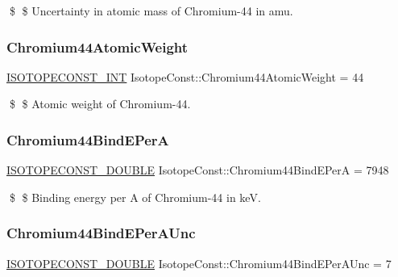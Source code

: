 \$ \$ Uncertainty in atomic mass of Chromium-\/44 in amu. \mbox{\label{group___isotope_const-_chromium-_cr44_gab95901f81604d8b8c011a24b634533bf}} 
\subsubsection{\texorpdfstring{Chromium44\+Atomic\+Weight}{Chromium44AtomicWeight}}
{\footnotesize\ttfamily \mbox{\hyperlink{group___isotope_const-_macros_ga5f18360b3e99483a35c32d789e62621c}{I\+S\+O\+T\+O\+P\+E\+C\+O\+N\+S\+T\+\_\+\+I\+NT}} Isotope\+Const\+::\+Chromium44\+Atomic\+Weight = 44}

\$ \$ Atomic weight of Chromium-\/44. \mbox{\label{group___isotope_const-_chromium-_cr44_ga78a199af93f916420780eabaa50d2ca4}} 
\subsubsection{\texorpdfstring{Chromium44\+Bind\+E\+PerA}{Chromium44BindEPerA}}
{\footnotesize\ttfamily \mbox{\hyperlink{group___isotope_const-_macros_ga8f45a7272ce02c0b4c65c44636ed719a}{I\+S\+O\+T\+O\+P\+E\+C\+O\+N\+S\+T\+\_\+\+D\+O\+U\+B\+LE}} Isotope\+Const\+::\+Chromium44\+Bind\+E\+PerA = 7948}

\$ \$ Binding energy per A of Chromium-\/44 in keV. \mbox{\label{group___isotope_const-_chromium-_cr44_gaf82d4bd445d9e6979ed4a789d739ac2e}} 
\subsubsection{\texorpdfstring{Chromium44\+Bind\+E\+Per\+A\+Unc}{Chromium44BindEPerAUnc}}
{\footnotesize\ttfamily \mbox{\hyperlink{group___isotope_const-_macros_ga8f45a7272ce02c0b4c65c44636ed719a}{I\+S\+O\+T\+O\+P\+E\+C\+O\+N\+S\+T\+\_\+\+D\+O\+U\+B\+LE}} Isotope\+Const\+::\+Chromium44\+Bind\+E\+Per\+A\+Unc = 7}

